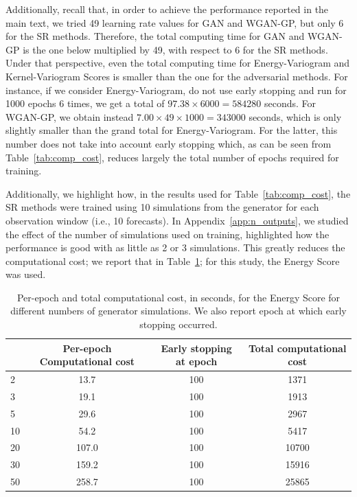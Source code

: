 \documentclass[twoside,11pt]{article}
\begin{document}
	Additionally, recall that, in order to achieve the performance reported in the main text, we tried 49 learning rate values for GAN and WGAN-GP, but only 6 for the SR methods. Therefore, the total computing time for GAN and WGAN-GP is the one below multiplied by 49, with respect to 6 for the SR methods. Under that perspective, even the total computing time for Energy-Variogram and Kernel-Variogram Scores is smaller than the one for the adversarial methods. For instance, if we consider Energy-Variogram, do not use early stopping and run for 1000 epochs 6 times, we get a total of $ 97.38\times 6000 = 584280 $ seconds. For WGAN-GP, we obtain instead $ 7.00\times49\times1000 = 343000 $ seconds, which is only slightly smaller than the grand total for Energy-Variogram. For the latter, this number does not take into account early stopping which, as can be seen from Table~\ref{tab:comp_cost}, reduces largely the total number of epochs required for training.
	
	Additionally, we highlight how, in the results used for Table~\ref{tab:comp_cost}, the SR methods were trained using 10 simulations from the generator for each observation window (i.e., 10 forecasts). In Appendix~\ref{app:n_outputs}, we studied the effect of the number of simulations used on training, highlighted how the performance is good with as little as 2 or 3 simulations. This greatly reduces the computational cost; we report that in Table~\ref{tab:comp_cost_2}; for this study, the Energy Score was used.
	
	
	\begin{table}[tb]
		\begin{center}
			\begin{tabular}{lccc}
				\toprule
				& Per-epoch Computational cost & Early stopping at epoch & Total computational cost \\
				\midrule
				2 & 13.7    &  100   &   1371   \\
				3 &  19.1  &   100  &   1913 \\
				5 & 	29.6	    &  100   &  2967   \\
				10 & 	 54.2 & 100  &  5417 	\\
				20 &	107.0	    &   100  &  10700    \\
				30 	&	 159.2   &  100   &   15916  \\
				50 &   258.7  &   100  &  25865    \\
				\bottomrule
			\end{tabular}
		\end{center}
		\caption{Per-epoch and total computational cost, in seconds, for the Energy Score for different numbers of generator simulations. We also report epoch at which early stopping occurred.}\label{tab:comp_cost_2}
	\end{table}
	
\end{document}
